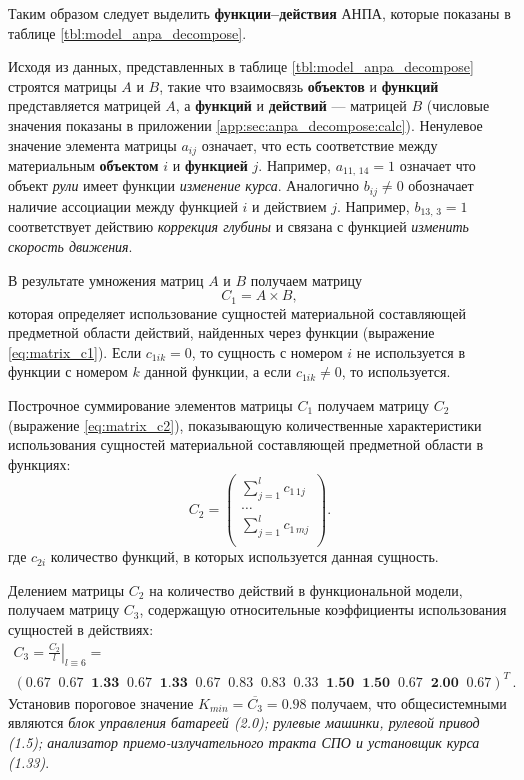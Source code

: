 Таким образом следует выделить \textbf{функции--действия} АНПА, которые показаны в таблице
\ref{tbl:model_anpa_decompose}.


Исходя из данных, представленных в таблице \ref{tbl:model_anpa_decompose}
строятся матрицы $A$ и $B$, такие что
взаимосвязь \textbf{объектов} и \textbf{функций} представляется матрицей $A$,
а \textbf{функций} и \textbf{действий} --- матрицей $B$ (числовые значения показаны в приложении \ref{app:sec:anpa_decompose:calc}).
Ненулевое значение элемента матрицы $a_{ij}$ означает, что есть соответствие между материальным \textbf{объектом} $i$ и \textbf{функцией} $j$.
Например, $a_{11,\,14} = 1$ означает что объект \textit{рули} имеет функции \textit{изменение курса}.
Аналогично $b_{ij} \ne 0$ обозначает наличие ассоциации между функцией $i$ и действием $j$.
Например, $b_{13,\,3} = 1$ соответствует действию \textit{коррекция глубины} и связана с функцией \textit{изменить скорость движения}.

В результате умножения матриц $A$ и $B$ получаем матрицу $$C_1 = A \times B,$$
которая определяет использование сущностей материальной составляющей предметной области действий, найденных через функции
(выражение \eqref{eq:matrix_c1}). Если $c_{1ik} = 0$, то сущность с номером $i$ не используется в функции с номером $k$ данной функции,
а если $c_{1ik} \ne 0$, то используется.

Построчное суммирование элементов матрицы $C_1$ получаем матрицу $C_2$ (выражение \eqref{eq:matrix_c2}), показывающую количественные характеристики
использования сущностей материальной составляющей предметной области в функциях:
\begin{equation*}
    C_2 = \begin{pmatrix}
        \sum_{j=1}^l c_{1\,1j} \\
        \ldots \\
        \sum_{j=1}^l c_{1\,mj} \\
    \end{pmatrix}.
\end{equation*}
где $c_{2i}$ количество функций, в которых используется данная сущность.

Делением матрицы $C_2$ на количество действий в функциональной модели, получаем матрицу $C_3$,
содержащую относительные коэффициенты использования сущностей в действиях:
\begin{multline*}
    C_3 = \left. \frac{C_2}{l} \right|_{l \equiv 6} = \\
        \left( 0.67\;\; 0.67\;\; \textbf{1.33}\;\; 0.67\;\; \textbf{1.33}\;\; 0.67\;\; 0.83\;\; 0.83\;\; 
        0.33\;\; \textbf{1.50}\;\;\textbf{1.50}\;\; 0.67\;\; \textbf{2.00}\;\; 0.67 \right)^T\,.
\end{multline*}
Установив пороговое значение $K_{min} = \overline{C_3} = 0.98$ получаем, что общесистемными являются
\textit{блок управления батареей (2.0);
    рулевые машинки, рулевой привод (1.5);
    анализатор приемо-излучательного тракта СПО и установщик курса (1.33)}.

